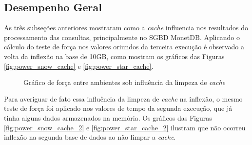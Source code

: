 \subsection{Desempenho Geral}

As três subseções anteriores mostraram como a \textit{cache} influencia nos resultados do processamento das consultas, principalmente no SGBD MonetDB. Aplicando o cálculo do teste de força nos valores oriundos da terceira execução é observado a volta da inflexão na base de 10GB, como mostram os gráficos das Figuras \ref{fig:power_snow_cache} e \ref{fig:power_star_cache}.

\begin{figure}[htpb]
        \centering
        \caption{Gráfico de força entre ambientes sob influência da limpeza de \textit{cache}}
        \label{fig:power_cache}
\end{figure}

Para averiguar de fato essa influência da limpeza de \textit{cache} na inflexão, o mesmo teste de força foi aplicado nos valores de tempo da segunda execução, que já tinha alguns dados armazenados na memória. Os gráficos das Figuras \ref{fig:power_snow_cache_2} e \ref{fig:power_star_cache_2} ilustram que não ocorreu inflexão na segunda base de dados ao não limpar a \textit{cache}.

